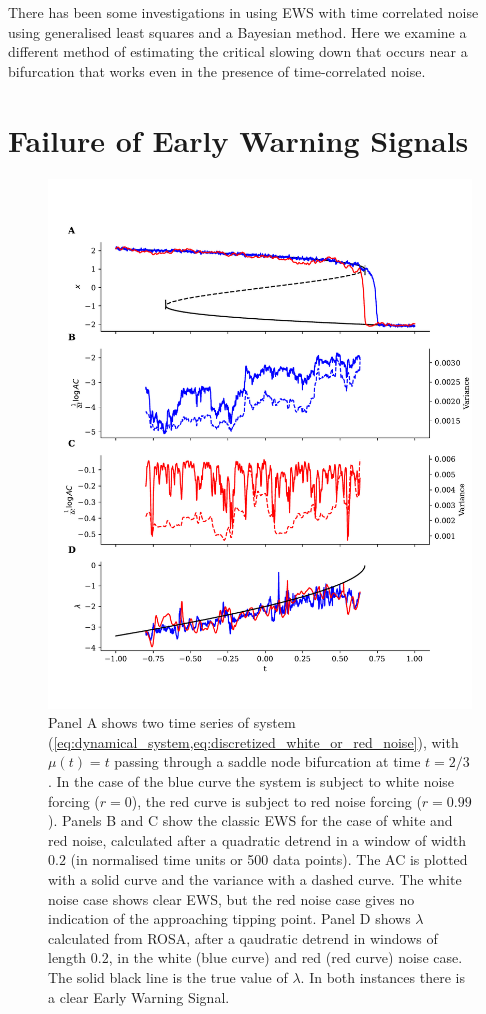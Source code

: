 There has been some investigations in using EWS with time correlated noise using generalised least
squares\cite{Boers2021a,Boettner2022} and a Bayesian method\cite{hessler2022,Hessler2022b}. Here we examine a different method of
estimating the critical slowing down that occurs near a bifurcation that works even in the presence of time-correlated noise.

\section{Failure of Early Warning Signals}\label{sec:failure}
\begin{figure}
\includegraphics[width=\textwidth,keepaspectratio]{figure1}
\caption[Early Warning Signals Failing]
{Panel A shows two time series of system (\cref{eq:dynamical_system,eq:discretized_white_or_red_noise}), with $\mu(t)=t$ passing through a saddle node bifurcation at time $t=2/3$. 
  In the case of the blue curve the system
  is subject to white noise forcing ($r=0$), the red curve is subject to 
  red noise forcing ($r=0.99$). Panels B and C show the
  classic EWS for the case of white and
  red noise, calculated after a
  quadratic detrend in a window of width $0.2$ (in normalised time units or 500 data points).
  The AC is plotted with a solid curve and
  the variance with a 
  dashed curve.
  The white noise case shows clear EWS, 
  but the red noise case gives no indication of the approaching tipping point. Panel D shows $\lambda$ calculated from ROSA, after a
  qaudratic detrend in windows of length $0.2$, in the
  white (blue curve) and red (red curve) noise case. The solid black 
  line is the true value of $\lambda$. In both instances there
  is a clear Early Warning Signal.}\label{fig:failure_of_ews}
\end{figure}

